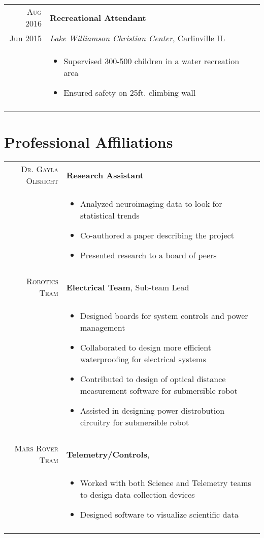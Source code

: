 \documentclass[a4paper,10pt]{article}
\newcommand{\br}{\\\multicolumn{2}{c}{}}
\begin{document}
\begin{tabular}{r|p{15cm}}
    \textsc{Aug 2016} & \textbf{Recreational Attendant} \\
    Jun 2015          & \textit{Lake Williamson Christian Center}, Carlinville IL \\ &
    \begin{itemize}
    \item{Supervised 300-500 children in a water recreation area}
    \item{Ensured safety on 25ft. climbing wall}

    \end{itemize} \br\\

\end{tabular}


\section{Professional Affiliations}
\begin{tabular}{r|p{15cm}}
    \textsc{Dr. Gayla Olbricht} & \textbf{Research Assistant} \\
     & \begin{itemize}
    \item Analyzed neuroimaging data to look for statistical trends
    \item Co-authored a paper describing the project
    \item Presented research to a board of peers
    \end{itemize} \br\\

    \textsc{Robotics Team} & \textbf{Electrical Team}, Sub-team Lead \\
     & \begin{itemize}
     \item Designed boards for system controls and power management
     \item Collaborated to design more efficient waterproofing for electrical systems
     \item Contributed to design of optical distance measurement software for submersible robot
     \item Assisted in designing power distrobution circuitry for submersible robot
    \end{itemize} \br\\

    \textsc{Mars Rover Team} & \textbf{Telemetry/Controls}, \\
     & \begin{itemize}
     \item{Worked with both Science and Telemetry teams to design data collection devices}
     \item{Designed software to visualize scientific data}
     \end{itemize} \br\\


\end{tabular}
\end{document}

